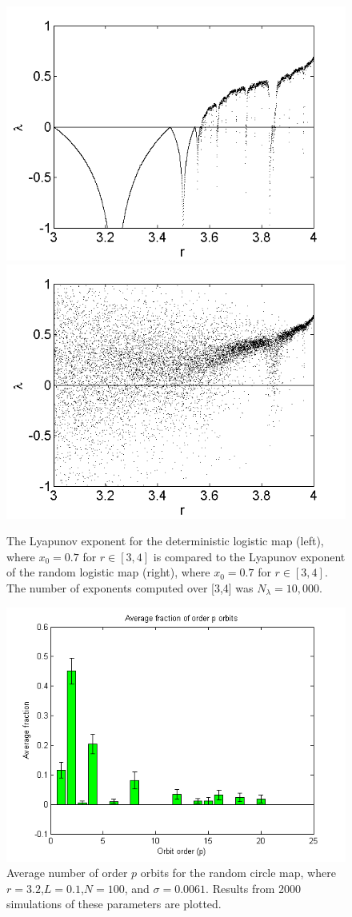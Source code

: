 \begin{figure}[!h]
\caption[Lyapunov exponent in the random logistic map compared to the
deterministic map]{The Lyapunov exponent for the deterministic
  logistic map (left), where $x_0=0.7$ for $r \in [3,4]$ is compared
  to the Lyapunov exponent of the random logistic map (right), where
  $x_0=0.7$ for $r \in [3,4]$. The number of exponents computed over
  [3,4] was $N_\lambda=10,000$. }\label{fig:rloglyap2}
\centering
\includegraphics[width=.5\textwidth]{figs/det_log_lyap.png}\hfill
\includegraphics[width=.5\textwidth]{figs/r_log_lyap_zoom.png}
\end{figure}

\begin{figure}[H]\linespread{1}
\caption[Average number of order $p$ orbits for the random circle
map]{Average number of order $p$ orbits for the random circle
map, where $r =3.2$,$L=0.1$,$N=100$, and $\sigma = 0.0061$. Results from 2000
simulations of these parameters are plotted.}
	\begin{center}
          \includegraphics[scale=0.7]{figs/rlog_hist_r32_L01.png}
	\end{center}
\end{figure}

